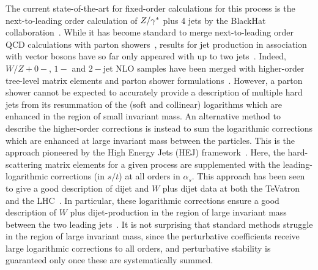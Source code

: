 		The current state-of-the-art for fixed-order calculations for this process is the
		next-to-leading order calculation of $Z/\gamma^*$ plus 4 jets by the BlackHat
		collaboration~\cite{Ita:2011wn}.
		While it has become standard to merge next-to-leading order QCD calculations
		with parton
		showers~\cite{Frixione:2002ik,Nason:2004rx,Frixione:2007vw,Alioli:2010xd,Frixione:2010wd,Alwall:2014hca},
		results for jet production in association with vector bosons have so far only appeared with up to two
		jets~\cite{Re:2012zi,Campbell:2013vha}.  Indeed, $W/Z+0-$, $1-$ and
		$2-$jet NLO samples have been merged with higher-order tree-level matrix
		elements and parton
		shower formulations~\cite{Hoeche:2012yf,Frederix:2015eii}. However, a parton shower cannot be expected to
		accurately provide a description of multiple hard jets from its resummation of
		the (soft and collinear) logarithms which are enhanced in the region of small
		invariant mass.  An alternative method to describe the higher-order
		corrections is instead to sum the logarithmic corrections which are enhanced at
		large invariant mass between the particles.  This is the approach pioneered by
		the High Energy Jets (HEJ) framework~\cite{Andersen:2009nu,Andersen:2009he}.
		Here, the hard-scattering matrix elements for a given process are supplemented
		with the leading-logarithmic corrections (in $s/t$) at all orders in
		$\alpha_s$. This approach has been seen to give a good description of dijet and
		$W$ plus dijet data at both the TeVatron~\cite{Abazov:2013gpa} and the
		LHC~\cite{Aad:2011jz,Chatrchyan:2012gwa,Chatrchyan:2012pb,Aad:2014pua,Aad:2014qxa}.
		In particular, these logarithmic corrections ensure a good description of $W$
		plus dijet-production in the region of large invariant mass between the
		two leading jets~\cite{Aad:2014qxa}. It is not surprising that standard
		methods struggle in the region of large invariant mass, since the
		perturbative coefficients receive large logarithmic corrections
		to all orders, and perturbative stability is guaranteed only once these are systematically summed.

